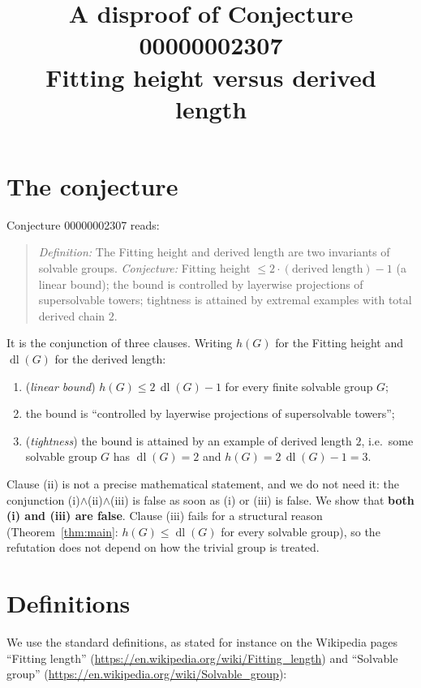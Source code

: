 \documentclass[11pt]{article}
\title{A disproof of Conjecture 00000002307\\[2pt]
\large Fitting height versus derived length}
\date{}
\theoremstyle{definition}
\theoremstyle{remark}
\renewcommand{\_}{\oldus\allowbreak}
\newcommand{\dl}{\operatorname{dl}}
\begin{document}
\sloppy
\maketitle

\section{The conjecture}

Conjecture 00000002307 reads:

\begin{quote}
\emph{Definition:} The Fitting height and derived length are two invariants of solvable groups.
\emph{Conjecture:} Fitting height $\le 2\cdot(\text{derived length}) - 1$ (a linear bound); the bound is
controlled by layerwise projections of supersolvable towers; tightness is attained by extremal examples
with total derived chain $2$.
\end{quote}

It is the conjunction of three clauses. Writing $h(G)$ for the Fitting height and $\dl(G)$ for the derived
length:
\begin{enumerate}[label=(\roman*)]
  \item (\emph{linear bound}) $h(G) \le 2\,\dl(G) - 1$ for every finite solvable group $G$;
  \item the bound is ``controlled by layerwise projections of supersolvable towers'';
  \item (\emph{tightness}) the bound is attained by an example of derived length $2$, i.e.\ some solvable group
        $G$ has $\dl(G)=2$ and $h(G) = 2\,\dl(G)-1 = 3$.
\end{enumerate}
Clause (ii) is not a precise mathematical statement, and we do not need it: the conjunction
(i)$\wedge$(ii)$\wedge$(iii) is false as soon as (i) or (iii) is false. We show that \textbf{both (i) and
(iii) are false}. Clause (iii) fails for a structural reason (Theorem~\ref{thm:main}: $h(G)\le \dl(G)$ for
every solvable group), so the refutation does not depend on how the trivial group is treated.

\section{Definitions}

We use the standard definitions, as stated for instance on the Wikipedia pages ``Fitting length''
(\url{https://en.wikipedia.org/wiki/Fitting_length}) and ``Solvable group''
(\url{https://en.wikipedia.org/wiki/Solvable_group}):
\end{document}
